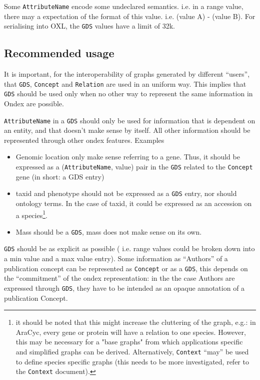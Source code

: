 \documentclass[a4paper,10pt]{article}
\newcommand{\term}[1]{\texttt{#1}\xspace}
\newcommand{\an}{\term{AttributeName}}
\newcommand{\gds}{\term{GDS}}
\begin{document}
\vskip 0.5cm
\noindent
Some \an encode some undeclared semantics. i.e. in a range value, there may a expectation of the format of this value. i.e. (value A) - (value B).
\vskip 0.5cm
\noindent
For serialising into OXL, the \gds values have a limit of 32k.

\subsection{Recommended usage}
It is important, for the interoperability of graphs generated by different ``users'', that \term{GDS}, \term{Concept} and \term{Relation} are used in an uniform way. This implies that \term{GDS} should be used only when no other way to represent the same information in Ondex are possible.
\vskip 0.5cm

\an in a \gds should only be used for information that is dependent on an entity, and that doesn't make sense by itself. All other information should be represented through other ondex features.
\vskip 0.5cm
\noindent
Examples
\begin{itemize}
\item Genomic location only make sense referring to a gene. Thus, it should be expressed as a (\an, value) pair in the \gds related to the \term{Concept} gene (in short: a GDS entry)
\item taxid and phenotype should not be expressed as a \gds entry, nor should ontology terms. In the case of taxid, it could be expressed as an accession on a species\footnote{it should be noted that this might increase the cluttering of the graph, e.g.: in AraCyc, every gene or protein will have a relation to one species. However, this may be necessary for a "base graphs" from which applications specific and simplified graphs can be derived. Alternatively, \term{Context} ``may'' be used to define species specific graphs (this needs to be more investigated, refer to the \term{Context} document).}.
\item Mass should be a \gds, mass does not make sense on its own.
\end{itemize}
\noindent
\gds should be as explicit as possible ( i.e. range values could be broken down into a min value and a max value entry).
\vskip 0.5cm
Some information as ``Authors'' of a publication concept can be represented as \term{Concept} or as a \gds, this depends on the ``commitment'' of the ondex representation: in the the case Authors are expressed through \gds, they have to be intended as an opaque annotation of a publication Concept.
\vskip 0.5cm
\noindent
\end{document}
